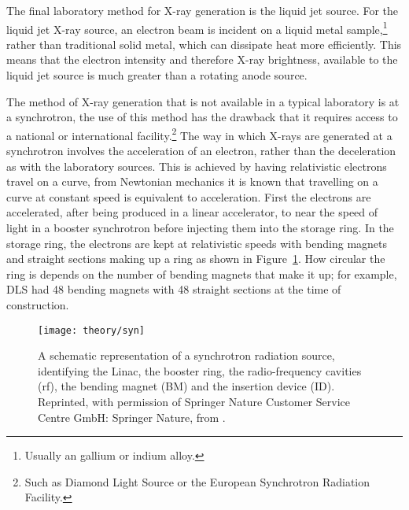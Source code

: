 The final laboratory method for X-ray generation is the liquid jet source.
For the liquid jet X-ray source, an electron beam is incident on a liquid metal sample,\footnote{Usually an gallium or indium alloy.} rather than traditional solid metal, which can dissipate heat more efficiently.
This means that the electron intensity and therefore X-ray brightness, available to the liquid jet source is much greater than a rotating anode source.

The method of X-ray generation that is not available in a typical laboratory is at a synchrotron, the use of this method has the drawback that it requires access to a national or international facility.\footnote{Such as Diamond Light Source or the European Synchrotron Radiation Facility.}
The way in which X-rays are generated at a synchrotron involves the acceleration of an electron, rather than the deceleration as with the laboratory sources.
This is achieved by having relativistic electrons travel on a curve, from Newtonian mechanics it is known that travelling on a curve at constant speed is equivalent to acceleration.
First the electrons are accelerated, after being produced in a linear accelerator, to near the speed of light in a booster synchrotron before injecting them into the storage ring.
In the storage ring, the electrons are kept at relativistic speeds with bending magnets and straight sections making up a ring as shown in Figure~\ref{fig:syn}.
How circular the ring is depends on the number of bending magnets that make it up; for example, DLS had \num{48} bending magnets with \num{48} straight sections at the time of construction.
%
\begin{figure}[t]
    \centering
    \texttt{[image: theory/syn]}
    \caption{A schematic representation of a synchrotron radiation source, identifying the Linac, the booster ring, the radio-frequency cavities (rf), the bending magnet (BM) and the insertion device (ID). Reprinted, with permission of Springer Nature Customer Service Centre GmbH: Springer Nature, from \cite{garcia-gutierrez_bases_2009}.}
    \label{fig:syn}
\end{figure}
%

